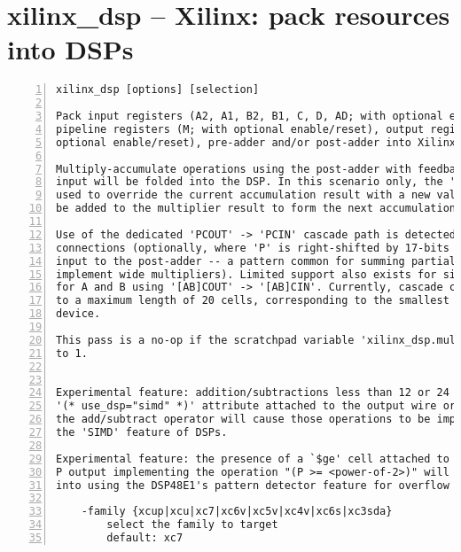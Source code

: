 \section{xilinx\_dsp -- Xilinx: pack resources into DSPs}
\label{cmd:xilinx_dsp}
\begin{lstlisting}[numbers=left,frame=single]
    xilinx_dsp [options] [selection]

Pack input registers (A2, A1, B2, B1, C, D, AD; with optional enable/reset),
pipeline registers (M; with optional enable/reset), output registers (P; with
optional enable/reset), pre-adder and/or post-adder into Xilinx DSP resources.

Multiply-accumulate operations using the post-adder with feedback on the 'C'
input will be folded into the DSP. In this scenario only, the 'C' input can be
used to override the current accumulation result with a new value, which will
be added to the multiplier result to form the next accumulation result.

Use of the dedicated 'PCOUT' -> 'PCIN' cascade path is detected for 'P' -> 'C'
connections (optionally, where 'P' is right-shifted by 17-bits and used as an
input to the post-adder -- a pattern common for summing partial products to
implement wide multipliers). Limited support also exists for similar cascading
for A and B using '[AB]COUT' -> '[AB]CIN'. Currently, cascade chains are limited
to a maximum length of 20 cells, corresponding to the smallest Xilinx 7 Series
device.

This pass is a no-op if the scratchpad variable 'xilinx_dsp.multonly' is set
to 1.


Experimental feature: addition/subtractions less than 12 or 24 bits with the
'(* use_dsp="simd" *)' attribute attached to the output wire or attached to
the add/subtract operator will cause those operations to be implemented using
the 'SIMD' feature of DSPs.

Experimental feature: the presence of a `$ge' cell attached to the registered
P output implementing the operation "(P >= <power-of-2>)" will be transformed
into using the DSP48E1's pattern detector feature for overflow detection.

    -family {xcup|xcu|xc7|xc6v|xc5v|xc4v|xc6s|xc3sda}
        select the family to target
        default: xc7
\end{lstlisting}

